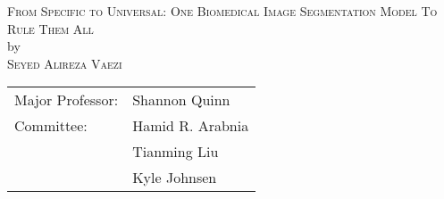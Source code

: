 \documentclass[12pt, notitlepage, twoside]{report}
\begin{document}
\newcommand{\doctitle}{From Specific to Universal: One Biomedical Image Segmentation Model To Rule Them All}
\newcommand{\docauthor}{Seyed Alireza Vaezi}



%



\newcommand{\degreesearned}{%
  M.S., Iran University of Science and Technology (IUST), Iran, 2016 \\
}%

\newcommand{\degreetype}{Dissertation}
\newcommand{\degreetitle}{Doctor of Philosophy}
\newcommand{\degreename}{in Computer Science}
\newcommand{\degreeyear}{2025}
\maketitlepage





\newpage
\thispagestyle{empty}
\vspace*{18pt}
\begin{center}
  \textsc{\doctitle}\\[18pt]
  by\\[18pt]
  \textsc{\docauthor}
\end{center}
\vfill

\begin{flushright}
  \begin{tabular}{ll}
    Major Professor: & Shannon Quinn    \\ [8pt]
    Committee:       & Hamid R. Arabnia \\
                     & Tianming Liu     \\
                     & Kyle Johnsen     \\
  \end{tabular}
\end{flushright}
\end{document}
